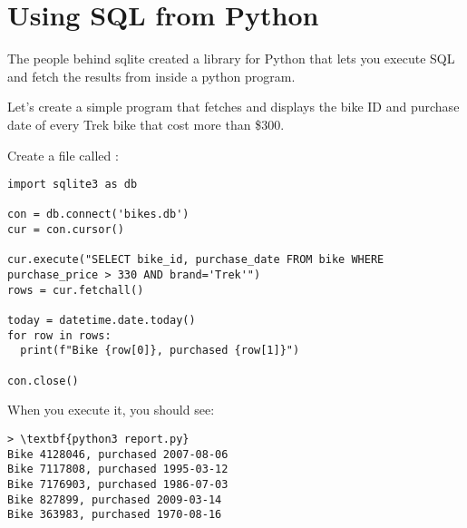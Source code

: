 \section{Using SQL from Python}

The people behind sqlite created a library for Python that lets you
execute SQL and fetch the results from inside a python program.

Let's create a simple program that fetches and displays the bike ID
and purchase date of every Trek bike that cost more than \$300.

Create a file called :
\begin{Verbatim}
import sqlite3 as db

con = db.connect('bikes.db')
cur = con.cursor()

cur.execute("SELECT bike_id, purchase_date FROM bike WHERE purchase_price > 330 AND brand='Trek'")
rows = cur.fetchall()

today = datetime.date.today()
for row in rows:
  print(f"Bike {row[0]}, purchased {row[1]}")

con.close()
\end{Verbatim}

When you execute it, you should see:
\begin{Verbatim}[commandchars=\\\{\}]
> \textbf{python3 report.py}
Bike 4128046, purchased 2007-08-06
Bike 7117808, purchased 1995-03-12
Bike 7176903, purchased 1986-07-03
Bike 827899, purchased 2009-03-14
Bike 363983, purchased 1970-08-16
\end{Verbatim}

